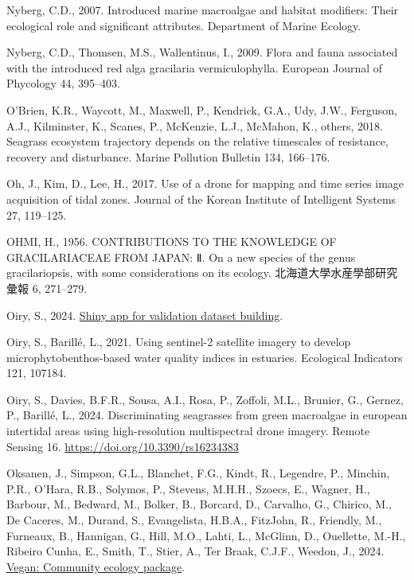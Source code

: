\documentclass[
  letterpaper,
  11pt,
  english,
  singlespacing,
  headsepline]{MastersDoctoralThesis}
\newlength{\cslhangindent}
\newenvironment{CSLReferences}[2] %
 {\begin{list}{}{%
  \setlength{\itemindent}{0pt}
  \setlength{\leftmargin}{0pt}
  \setlength{\parsep}{0pt}
  \ifodd #1
   \setlength{\leftmargin}{\cslhangindent}
   \setlength{\itemindent}{-1\cslhangindent}
  \fi
  \setlength{\itemsep}{#2\baselineskip}}}
 {\end{list}}
\begin{document}
\begin{CSLReferences}{1}{0}
Nyberg, C.D., 2007. Introduced marine macroalgae and habitat modifiers:
Their ecological role and significant attributes. Department of Marine
Ecology.

Nyberg, C.D., Thomsen, M.S., Wallentinus, I., 2009. Flora and fauna
associated with the introduced red alga gracilaria vermiculophylla.
European Journal of Phycology 44, 395--403.

O'Brien, K.R., Waycott, M., Maxwell, P., Kendrick, G.A., Udy, J.W.,
Ferguson, A.J., Kilminster, K., Scanes, P., McKenzie, L.J., McMahon, K.,
others, 2018. Seagrass ecosystem trajectory depends on the relative
timescales of resistance, recovery and disturbance. Marine Pollution
Bulletin 134, 166--176.

Oh, J., Kim, D., Lee, H., 2017. Use of a drone for mapping and time
series image acquisition of tidal zones. Journal of the Korean Institute
of Intelligent Systems 27, 119--125.

OHMI, H., 1956. CONTRIBUTIONS TO THE KNOWLEDGE OF GRACILARIACEAE FROM
JAPAN: Ⅱ. On a new species of the genus gracilariopsis, with some
considerations on its ecology. 北海道大學水産學部研究彙報 6, 271--279.

Oiry, S., 2024.
\href{https://oirysimon.shinyapps.io/shiny_validate/}{Shiny app for
validation dataset building}.

Oiry, S., Barillé, L., 2021. Using sentinel-2 satellite imagery to
develop microphytobenthos-based water quality indices in estuaries.
Ecological Indicators 121, 107184.

Oiry, S., Davies, B.F.R., Sousa, A.I., Rosa, P., Zoffoli, M.L., Brunier,
G., Gernez, P., Barillé, L., 2024. Discriminating seagrasses from green
macroalgae in european intertidal areas using high-resolution
multispectral drone imagery. Remote Sensing 16.
\url{https://doi.org/10.3390/rs16234383}

Oksanen, J., Simpson, G.L., Blanchet, F.G., Kindt, R., Legendre, P.,
Minchin, P.R., O'Hara, R.B., Solymos, P., Stevens, M.H.H., Szoecs, E.,
Wagner, H., Barbour, M., Bedward, M., Bolker, B., Borcard, D., Carvalho,
G., Chirico, M., De Caceres, M., Durand, S., Evangelista, H.B.A.,
FitzJohn, R., Friendly, M., Furneaux, B., Hannigan, G., Hill, M.O.,
Lahti, L., McGlinn, D., Ouellette, M.-H., Ribeiro Cunha, E., Smith, T.,
Stier, A., Ter Braak, C.J.F., Weedon, J., 2024.
\href{https://CRAN.R-project.org/package=vegan}{Vegan: Community ecology
package}.


\end{CSLReferences}
\end{document}
